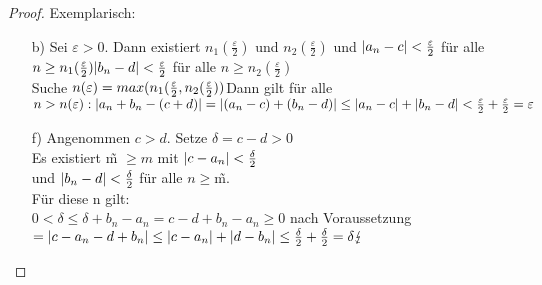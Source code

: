 \begin{proof}
Exemplarisch:\\
\begin{enumerate}
\item[b)] Sei $\varepsilon > 0$. Dann existiert $n_1(\frac{\varepsilon}{2})$ und $n_2(\frac{\varepsilon}{2})$ und $\lvert a_n -c \rvert < \frac{\varepsilon}{2}$ f\"ur alle $n \geq n_1(\frac{\varepsilon}{2})\\
\lvert b_n-d \rvert < \frac{\varepsilon}{2}$ f\"ur alle $n \geq n_2(\frac{\varepsilon}{2})$\\
Suche $n(\varepsilon) = max (n_1(\frac{\varepsilon}{2},n_2(\frac{\varepsilon}{2}))\\
$Dann gilt f\"ur alle $n > n(\varepsilon):\\
\lvert a_n+b_n - (c+d) \rvert = \lvert (a_n -c) + (b_n -d) \rvert \leq \lvert a_n -c \rvert + \lvert b_n -d \rvert < \frac{\varepsilon}{2} + \frac{\varepsilon}{2} = \varepsilon$
\item[f)]Angenommen $c > d$. Setze $\delta = c -d >0$\\
Es existiert \~m $ \geq m$ mit $\lvert c -a_n \rvert < \frac{\delta}{2}$\\
und $\lvert b_n -d \rvert < \frac{\delta}{2}$ f\"ur alle $n \geq$\~m.\\
F\"ur diese n gilt:\\
$0 < \delta \leq \delta + b_n - a_n = c -d+b_n -a_n \geq 0$ nach Voraussetzung\\
$= \lvert c -a_n - d +b_n \rvert \leq \lvert c-a_n \rvert + \lvert d -b_n \rvert\\
\leq \frac{\delta}{2} + \frac{\delta}{2} = \delta \lightning$
\end{enumerate}
\end{proof}
